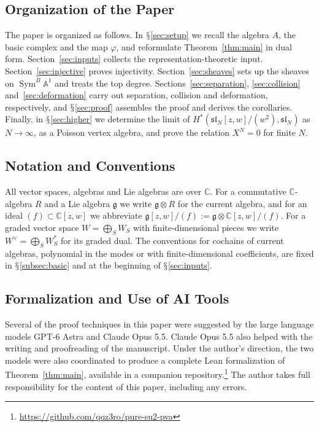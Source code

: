 \documentclass[11pt]{amsart}
\numberwithin{equation}{section}
\renewcommand{\S}{\mbox{$\mathsection$}}
\theoremstyle{definition}
\theoremstyle{remark}
\newcommand{\C}{\mathbb{C}}
\newcommand{\A}{\mathbb{A}}
\newcommand{\g}{\mathfrak{g}}
\newcommand{\Sym}{\operatorname{Sym}}
\begin{document}
\subsection{Organization of the Paper}
The paper is organized as follows. In \S\ref{sec:setup} we recall the algebra $A$, the basic complex and the map $\varphi$, and reformulate Theorem~\ref{thm:main} in dual form. Section~\ref{sec:inputs} collects the representation-theoretic input. Section~\ref{sec:injective} proves injectivity. Section~\ref{sec:sheaves} sets up the sheaves on $\Sym^B\A^1$ and treats the top degree. Sections~\ref{sec:separation}, \ref{sec:collision} and~\ref{sec:deformation} carry out separation, collision and deformation, respectively, and \S\ref{sec:proof} assembles the proof and derives the corollaries. Finally, in \S\ref{sec:higher} we determine the limit of $H^*(\mathfrak{sl}_N[z,w]/(w^2),\mathfrak{sl}_N)$ as $N\to\infty$, as a Poisson vertex algebra, and prove the relation $X^N=0$ for finite $N$.

\subsection{Notation and Conventions}\label{subsec:conventions}
All vector spaces, algebras and Lie algebras are over $\C$. For a commutative $\C$-algebra $R$ and a Lie algebra $\g$ we write $\g\otimes R$ for the current algebra, and for an ideal $(f)\subset\C[z,w]$ we abbreviate $\g[z,w]/(f):=\g\otimes\C[z,w]/(f)$. For a graded vector space $W=\bigoplus_SW_S$ with finite-dimensional pieces we write $W^\vee=\bigoplus_SW_S^*$ for its graded dual. The conventions for cochains of current algebras, polynomial in the modes or with finite-dimensional coefficients, are fixed in \S\ref{subsec:basic} and at the beginning of \S\ref{sec:inputs}.

\subsection{Formalization and Use of AI Tools}
Several of the proof techniques in this paper were suggested by the large language models GPT-6 Astra and Claude Opus 5.5. Claude Opus 5.5 also helped with the writing and proofreading of the manuscript. Under the author's direction, the two models were also coordinated to produce a complete Lean formalization of Theorem~\ref{thm:main}, available in a companion repository.\footnote{\url{https://github.com/qqz3ro/pure-su2-pva}} The author takes full responsibility for the content of this paper, including any errors.
\end{document}
